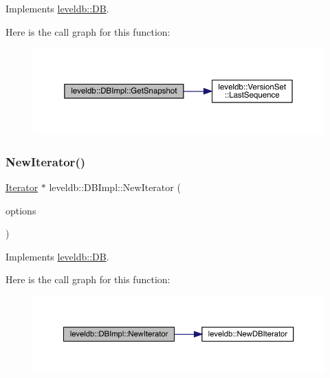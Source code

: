 Implements \mbox{\hyperlink{classleveldb_1_1_d_b_a7d13f6336c7c5f0bf79578d57c45568c}{leveldb\+::\+DB}}.

Here is the call graph for this function\+:
\nopagebreak
\begin{figure}[H]
\begin{center}
\leavevmode
\includegraphics[width=350pt]{classleveldb_1_1_d_b_impl_a4bec3d8ffd65fec562b2dd1f6eaba137_cgraph}
\end{center}
\end{figure}
\mbox{\label{classleveldb_1_1_d_b_impl_ae955dc8f2a1c38588723a0882653cb58}} 
\subsubsection{\texorpdfstring{NewIterator()}{NewIterator()}}
{\footnotesize\ttfamily \mbox{\hyperlink{classleveldb_1_1_iterator}{Iterator}} $\ast$ leveldb\+::\+D\+B\+Impl\+::\+New\+Iterator (\begin{DoxyParamCaption}\item[{const \mbox{\hyperlink{structleveldb_1_1_read_options}{Read\+Options}} \&}]{options }\end{DoxyParamCaption})\hspace{0.3cm}{\ttfamily [virtual]}}



Implements \mbox{\hyperlink{classleveldb_1_1_d_b_a5629308235de24c05c286c353d4e7d32}{leveldb\+::\+DB}}.

Here is the call graph for this function\+:
\nopagebreak
\begin{figure}[H]
\begin{center}
\leavevmode
\includegraphics[width=350pt]{classleveldb_1_1_d_b_impl_ae955dc8f2a1c38588723a0882653cb58_cgraph}
\end{center}
\end{figure}
\mbox{\label{classleveldb_1_1_d_b_impl_ad0d56aeb4d84ff9632c9a7f3f1b7c4d5}} 
